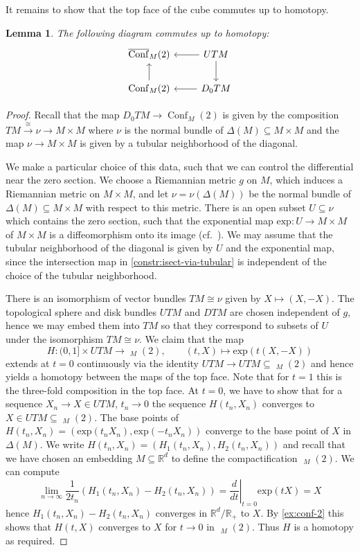 \documentclass{scrartcl}
\theoremstyle{plain}
\newtheorem{lemma}[theorem]{Lemma}
\theoremstyle{definition}
\newcommand{\R}{\mathbb R}
\renewcommand{\subset}{\subseteq}
\newcommand{\iso}{\cong}
\let\xto\xrightarrow
\DeclareMathOperator{\Conf}{Conf}
\DeclareMathOperator{\cConf}{\overline{Conf}}
\begin{document}
It remains to show that the top face of the cube commutes up to homotopy. 
\begin{lemma}\label{lem:intersection-product-via-cfg-spc-aid}
    The following diagram commutes up to homotopy:
    \[
        \begin{tikzcd}
            \cConf_M(2) & \lar UTM \dar \\
            \Conf_M(2) \uar & \lar D_0TM
        \end{tikzcd}
    \]
\end{lemma}
\begin{proof}
    Recall that the map $D_0TM \to \Conf_M(2)$ is given by the composition $TM\xto{\iso} \nu\to M\times M$ where $\nu$ is the normal bundle of $\Delta(M)\subset M\times M$ and the map $\nu\to M\times M$ is given by a tubular neighborhood of the diagonal. 

We make a particular choice of this data, such that we can control the differential near the zero section. We choose a Riemannian metric $g$ on $M$, which induces a Riemannian metric on $M\times M$, and let $\nu=\nu(\Delta(M))$ be the normal bundle of $\Delta(M)\subset M\times M$ with respect to this metric. There is an open subset $U\subset \nu$ which contains the zero section, such that the exponential map $\mathrm{exp}\colon U\to M\times M$ of $M\times M$ is a diffeomorphism onto its image (cf.\ \cite[Ex. 8-5]{lee2006riemannian}). We may assume that the tubular neighborhood of the diagonal is given by $U$ and the exponential map, since the intersection map in \cref{constr:isect-via-tubular} is independent of the choice of the tubular neighborhood.
   
There is an isomorphism of vector bundles $TM\iso \nu$ given by $X\mapsto (X, -X)$. The topological sphere and disk bundles $UTM$ and $DTM$ are chosen independent of $g$, hence we may embed them into $TM$ so that they correspond to subsets of $U$ under the isomorphism $TM\iso \nu$. We claim that the map 
$$H\colon (0, 1]\times UTM\to \cConf_M(2), \qquad (t, X)\mapsto \mathrm{exp}(t(X, -X))$$ 
extends at $t=0$ continuously via the identity $UTM\to UTM\subset \cConf_M(2)$ and hence yields a homotopy between the maps of the top face. Note that for $t=1$ this is the three-fold composition in the top face. At $t=0$, we have to show that for a sequence $X_n\to X\in UTM$, $t_n\to 0$ the sequence $H(t_n, X_n)$ converges to $X\in UTM\subset \cConf_M(2)$. The base points of $H(t_n, X_n) = (\mathrm{exp}(t_nX_n), \mathrm{exp}(-t_nX_n))$ converge to the base point of $X$ in $\Delta(M)$.    We write $H(t_n, X_n) = (H_1(t_n, X_n), H_2(t_n, X_n))$ and recall that we have chosen an embedding $M\subset \R^d$ to define the compactification $\cConf_M(2)$. We can compute $$\lim_{n\to\infty} \frac 1 {2t_n} (H_1(t_n, X_n) - H_2(t_n, X_n)) = \left.\frac{d}{dt}\right|_{t=0} \mathrm{exp}(tX) = X$$ hence $H_1(t_n, X_n) - H_2(t_n, X_n)$ converges in $\R^d/\R_+$ to $X$. By \cref{ex:conf-2} this shows that $H(t, X)$ converges to $X$ for $t\to 0$ in $\cConf_M(2)$. Thus $H$ is a homotopy as required.
\end{proof}
\end{document}
